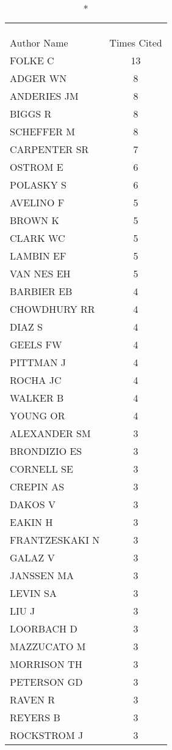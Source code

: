 \documentclass[]{article}
\begin{document}
\begin{longtable}{lc}
\caption*{
\large Most Frequently Cited Authors\textsuperscript{1}\\ 
\small \textsuperscript{}\\ 
} \\ 
\toprule
Author Name & Times Cited \\ 
\midrule
FOLKE C & 13 \\ 
ADGER WN & 8 \\ 
ANDERIES JM & 8 \\ 
BIGGS R & 8 \\ 
SCHEFFER M & 8 \\ 
CARPENTER SR & 7 \\ 
OSTROM E & 6 \\ 
POLASKY S & 6 \\ 
AVELINO F & 5 \\ 
BROWN K & 5 \\ 
CLARK WC & 5 \\ 
LAMBIN EF & 5 \\ 
VAN NES EH & 5 \\ 
BARBIER EB & 4 \\ 
CHOWDHURY RR & 4 \\ 
DIAZ S & 4 \\ 
GEELS FW & 4 \\ 
PITTMAN J & 4 \\ 
ROCHA JC & 4 \\ 
WALKER B & 4 \\ 
YOUNG OR & 4 \\ 
ALEXANDER SM & 3 \\ 
BRONDIZIO ES & 3 \\ 
CORNELL SE & 3 \\ 
CREPIN AS & 3 \\ 
DAKOS V & 3 \\ 
EAKIN H & 3 \\ 
FRANTZESKAKI N & 3 \\ 
GALAZ V & 3 \\ 
JANSSEN MA & 3 \\ 
LEVIN SA & 3 \\ 
LIU J & 3 \\ 
LOORBACH D & 3 \\ 
MAZZUCATO M & 3 \\ 
MORRISON TH & 3 \\ 
PETERSON GD & 3 \\ 
RAVEN R & 3 \\ 
REYERS B & 3 \\ 
ROCKSTROM J & 3 \\ 

\end{longtable}
\end{document}
